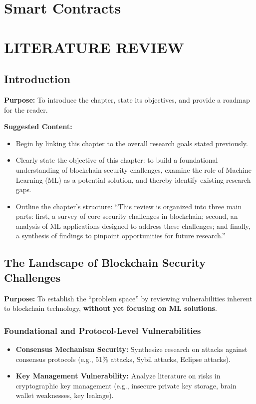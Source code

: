 \section{Smart Contracts}
	
	\section{LITERATURE REVIEW}
	
	\subsection{Introduction}
	\textbf{Purpose:} To introduce the chapter, state its objectives, and provide a roadmap for the reader.
	
	\textbf{Suggested Content:}
	\begin{itemize}
		\item Begin by linking this chapter to the overall research goals stated previously.
		\item Clearly state the objective of this chapter: to build a foundational understanding of blockchain security challenges, examine the role of Machine Learning (ML) as a potential solution, and thereby identify existing research gaps.
		\item Outline the chapter's structure: ``This review is organized into three main parts: first, a survey of core security challenges in blockchain; second, an analysis of ML applications designed to address these challenges; and finally, a synthesis of findings to pinpoint opportunities for future research.''
	\end{itemize}
	
	\subsection{The Landscape of Blockchain Security Challenges}
	\textbf{Purpose:} To establish the ``problem space'' by reviewing vulnerabilities inherent to blockchain technology, \textbf{without yet focusing on ML solutions}.
	
	\subsubsection{Foundational and Protocol-Level Vulnerabilities}
	\begin{itemize}
		\item \textbf{Consensus Mechanism Security:} Synthesize research on attacks against consensus protocols (e.g., 51\% attacks, Sybil attacks, Eclipse attacks).
		\item \textbf{Key Management Vulnerability:} Analyze literature on risks in cryptographic key management (e.g., insecure private key storage, brain wallet weaknesses, key leakage).
	\end{itemize}
	
